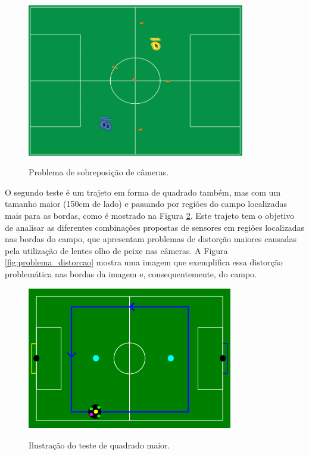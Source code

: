 \documentclass[acronym, symbols, table, deposito]{fei}
\begin{document}
		\begin{figure}[!htb]
			\centering
			\caption{Problema de sobreposição de câmeras.}
			\includegraphics[width=0.85\textwidth]{problema_overlap.png}
			\label{fig:problema_overlap}
		\end{figure}
	
		O segundo teste é um trajeto em forma de quadrado também, mas com um tamanho maior (150cm de lado) e passando por regiões do campo localizadas mais para as bordas, como é mostrado na Figura \ref{fig:representacao_teste_quadrado_maior}. Este trajeto tem o objetivo de analisar as diferentes combinações propostas de sensores em regiões localizadas nas bordas do campo, que apresentam problemas de distorção maiores causadas pela utilização de lentes olho de peixe nas câmeras. A Figura \ref{fig:problema_distorcao} mostra uma imagem que exemplifica essa distorção problemática nas bordas da imagem e, consequentemente, do campo.
			
		\begin{figure}[!htb]
			\centering
			\caption{Ilustração do teste de quadrado maior.}
			\includegraphics[width=0.80\textwidth]{representacao_teste_quadrado_maior.png}
			\label{fig:representacao_teste_quadrado_maior}
		\end{figure}
	
\end{document}
